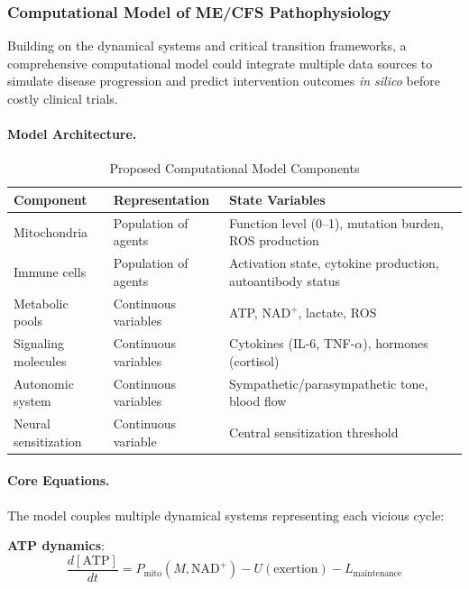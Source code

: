 \subsubsection{Computational Model of ME/CFS Pathophysiology}
\label{subsubsec:computational-model}

Building on the dynamical systems and critical transition frameworks, a comprehensive computational model could integrate multiple data sources to simulate disease progression and predict intervention outcomes \textit{in silico} before costly clinical trials.

\paragraph{Model Architecture.}

\begin{table}[htbp]
\centering
\caption{Proposed Computational Model Components}
\label{tab:model-components}
\begin{tabular}{p{3cm}p{4cm}p{5cm}}
\toprule
\textbf{Component} & \textbf{Representation} & \textbf{State Variables} \\
\midrule
Mitochondria & Population of agents & Function level (0--1), mutation burden, ROS production \\
\addlinespace
Immune cells & Population of agents & Activation state, cytokine production, autoantibody status \\
\addlinespace
Metabolic pools & Continuous variables & ATP, NAD$^+$, lactate, ROS \\
\addlinespace
Signaling molecules & Continuous variables & Cytokines (IL-6, TNF-$\alpha$), hormones (cortisol) \\
\addlinespace
Autonomic system & Continuous variables & Sympathetic/parasympathetic tone, blood flow \\
\addlinespace
Neural sensitization & Continuous variable & Central sensitization threshold \\
\bottomrule
\end{tabular}
\end{table}

\paragraph{Core Equations.}

The model couples multiple dynamical systems representing each vicious cycle:

\textbf{ATP dynamics}:
\[
\frac{d[\text{ATP}]}{dt} = P_{\text{mito}}(M, \text{NAD}^+) - U(\text{exertion}) - L_{\text{maintenance}}
\]

